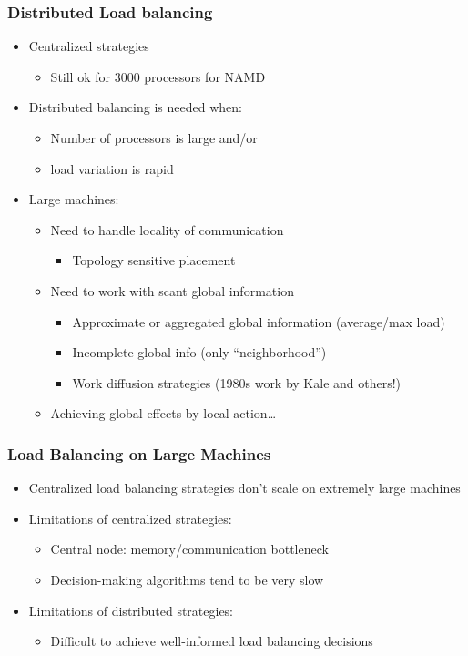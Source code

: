 \begin{frame}[fragile]
\frametitle{Distributed Load balancing}
\begin{itemize}
 \item Centralized strategies
 \begin{itemize}
  \item Still ok for 3000 processors for NAMD
 \end{itemize}
 \item Distributed balancing is needed when:
 \begin{itemize}
  \item Number of processors is large and/or 
  \item load variation is rapid
 \end{itemize}
 \item Large machines: 
 \begin{itemize}
  \item Need to handle locality of communication
  \begin{itemize}
   \item Topology sensitive placement
  \end{itemize}
  \item Need to work with scant global information
  \begin{itemize}
   \item Approximate or aggregated global information (average/max load)
   \item Incomplete global info (only “neighborhood”)
   \item Work diffusion strategies (1980s work by Kale and others!)
  \end{itemize}
  \item Achieving global effects by local action…
 \end{itemize}
\end{itemize}
\end{frame}

\begin{frame}[fragile]
\frametitle{Load Balancing on Large Machines}
\begin{itemize}
 \item Centralized load balancing strategies don’t scale on extremely large machines
 \item Limitations of centralized strategies:
 \begin{itemize}
  \item Central node: memory/communication bottleneck
  \item Decision-making algorithms tend to be very slow
 \end{itemize}
 \item Limitations of distributed strategies:
 \begin{itemize}
  \item Difficult to achieve well-informed load balancing decisions
 \end{itemize}
\end{itemize}
\end{frame}

